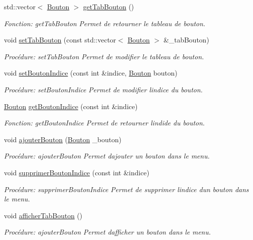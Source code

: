 \begin{DoxyCompactItemize}
std\+::vector$<$ \hyperlink{classBouton}{Bouton} $>$ \hyperlink{classMenu_a6d80af8bd800d44072ddb63a80b911cd}{get\+Tab\+Bouton} ()
\begin{DoxyCompactList}\small\item\em Fonction\+: get\+Tab\+Bouton Permet de retourner le tableau de bouton. \end{DoxyCompactList}\item 
void \hyperlink{classMenu_a45b3fe1a4d7cca82acabd3102d8bfd7c}{set\+Tab\+Bouton} (const std\+::vector$<$ \hyperlink{classBouton}{Bouton} $>$ \&\+\_\+tab\+Bouton)
\begin{DoxyCompactList}\small\item\em Procédure\+: set\+Tab\+Bouton Permet de modifier le tableau de bouton. \end{DoxyCompactList}\item 
void \hyperlink{classMenu_acedbb44af6fcc981aef033a585df2169}{set\+Bouton\+Indice} (const int \&indice, \hyperlink{classBouton}{Bouton} bouton)
\begin{DoxyCompactList}\small\item\em Procédure\+: set\+Bouton\+Indice Permet de modifier l\textquotesingle{}indice du bouton\textquotesingle{}. \end{DoxyCompactList}\item 
\hyperlink{classBouton}{Bouton} \hyperlink{classMenu_a16bc4dffec20a0ce177f189f9c711e09}{get\+Bouton\+Indice} (const int \&indice)
\begin{DoxyCompactList}\small\item\em Fonction\+: get\+Bouton\+Indice Permet de retourner l\textquotesingle{}indide du bouton. \end{DoxyCompactList}\item 
void \hyperlink{classMenu_a429b2c8fcaed081553ce284ffa0637ab}{ajouter\+Bouton} (\hyperlink{classBouton}{Bouton} \+\_\+bouton)
\begin{DoxyCompactList}\small\item\em Procédure\+: ajouter\+Bouton Permet d\textquotesingle{}ajouter un bouton dans le menu. \end{DoxyCompactList}\item 
void \hyperlink{classMenu_a1ed5172963be698f6fbabcf5a87ff664}{supprimer\+Bouton\+Indice} (const int \&indice)
\begin{DoxyCompactList}\small\item\em Procédure\+: supprimer\+Bouton\+Indice Permet de supprimer l\textquotesingle{}indice d\textquotesingle{}un bouton dans le menu. \end{DoxyCompactList}\item 
void \hyperlink{classMenu_af01f5f26519658b6e0fd92fdb8eda6fe}{afficher\+Tab\+Bouton} ()
\begin{DoxyCompactList}\small\item\em Procédure\+: ajouter\+Bouton Permet d\textquotesingle{}afficher\textquotesingle{} un bouton dans le menu. \end{DoxyCompactList}\end{DoxyCompactItemize}


